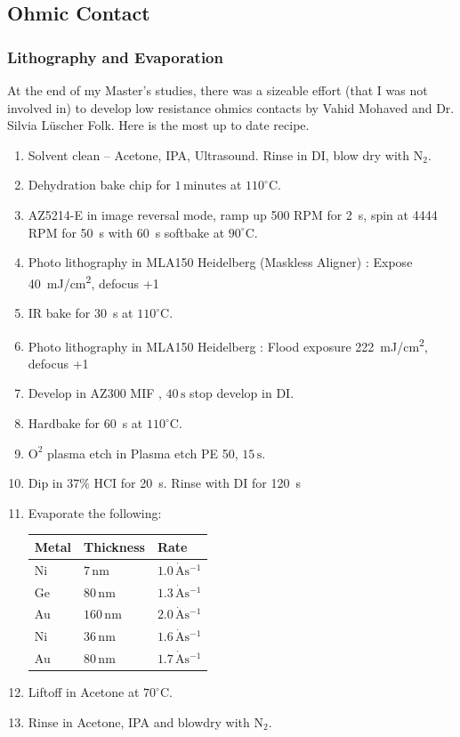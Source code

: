 \subsection{Ohmic Contact}

\subsubsection{Lithography and Evaporation}


At the end of my Master's studies, there was a sizeable effort (that I was not involved in) to develop low resistance ohmics contacts by Vahid Mohaved and Dr. Silvia Lüscher Folk. Here is the most up to date recipe. 


\begin{enumerate}
\item Solvent clean – Acetone, IPA, Ultrasound. Rinse in DI, blow dry with $\mathrm{N_2}$.
\item Dehydration bake chip for $1 \,\mathrm{minutes}$ at $110^\circ$C.
\item AZ5214-E in image reversal mode, ramp up 500 RPM for \qty{2}{s}, spin at 4444 RPM for \qty{50}{s} with \qty{60}{s} softbake at $90^\circ$C.
\item Photo lithography in MLA150 Heidelberg (Maskless Aligner) : Expose \qty{40}{mJ/cm^2}, defocus +1 
\item IR bake for \qty{30}{s} at $110^\circ$C.
\item Photo lithography in MLA150 Heidelberg : Flood exposure \qty{222}{mJ/cm^2}, defocus +1 
\item Develop in AZ300 MIF , $40\,\mathrm{s}$ stop develop in DI.
\item Hardbake for \qty{60}{s} at $110^\circ$C.
\item $\mathrm{O^2}$ plasma etch in Plasma etch PE 50, $15\,\mathrm{s}$.
\item Dip in $37\%$ HCI for \qty{20}{s}. Rinse with DI for \qty{120}{s}

\item Evaporate the following:

\begin{table}[H] 
\centering
 \begin{tabular}{|p{2.0cm}|p{2.0cm}|p{2.0cm}|}
 \hline
 Metal & Thickness & Rate\\
 \hline
 Ni & $7\,\mathrm{nm}$ & $1.0\,\mathrm{\dot{A}s^{-1}}$\\
 Ge & $80\,\mathrm{nm}$ & $1.3\,\mathrm{\dot{A}s^{-1}}$\\
 Au & $160\,\mathrm{nm}$ & $2.0\,\mathrm{\dot{A}s^{-1}}$\\
 Ni & $36\,\mathrm{nm}$ & $1.6\,\mathrm{\dot{A}s^{-1}}$\\
 Au & $80\,\mathrm{nm}$ & $1.7\,\mathrm{\dot{A}s^{-1}}$\\
 \hline
 \end{tabular}
\label{tab:ohmic_evaporation}
\end{table}
\item Liftoff in Acetone at $70^\circ$C.
\item Rinse in Acetone, IPA and blowdry with $\mathrm{N_2}$.
\end{enumerate}



